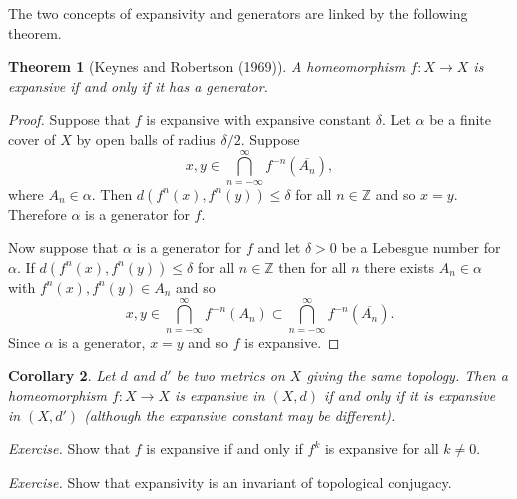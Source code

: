 \documentclass[12pt]{article}
\newtheorem{theorem}{Theorem}[section]
\newtheorem{corollary}[theorem]{Corollary}
\theoremstyle{definition}
\theoremstyle{remark}
\begin{document}
The two concepts of expansivity and generators are linked by the following theorem.

\begin{theorem} [Keynes and Robertson (1969)]\label{thm:exp_iff_gen}
A homeomorphism $f : X \to X$ is expansive if and only if it has a generator.
\end{theorem}

\begin{proof}
Suppose that $f$ is expansive with expansive constant $\delta$.
Let $\alpha$ be a finite cover of $X$ by open balls of radius $\delta/2$. Suppose
\[
x,y \in \bigcap_{n=-\infty}^\infty f^{-n}(\overline{A_n}),
\]
where $A_n \in \alpha$. Then $d(f^n(x),f^n(y)) \le \delta$ for all $n \in \mathbb Z$ and so
$x=y$. Therefore $\alpha$ is a generator for $f$.

Now suppose that $\alpha$ is a generator for $f$ and let $\delta>0$ be a Lebesgue number for 
$\alpha$. If $d(f^n(x),f^n(y)) \le \delta$ for all $n \in \mathbb Z$ then for all $n$ there exists $A_n \in \alpha$ with $f^n(x),f^n(y) \in A_n$ and so 
\[
x,y \in \bigcap_{n=-\infty}^\infty f^{-n}(A_n) \subset \bigcap_{n=-\infty}^\infty f^{-n}(\overline{A_n}).
\]
Since $\alpha$ is a generator, $x=y$ and so $f$ is expansive.
\end{proof}

\begin{corollary}
Let $d$ and $d'$ be two metrics on $X$ giving the same topology. Then a homeomorphism
$f : X \to X$ is expansive in $(X,d)$ if and only if it is expansive in $(X,d')$ (although the expansive constant may be different).
\end{corollary}



\medskip
\noindent
{\it Exercise.} Show that $f$ is expansive if and only if $f^k$ is expansive for all $k \ne 0$.




\medskip
\noindent
{\it Exercise.} Show that expansivity is an invariant of topological conjugacy.
\end{document}
